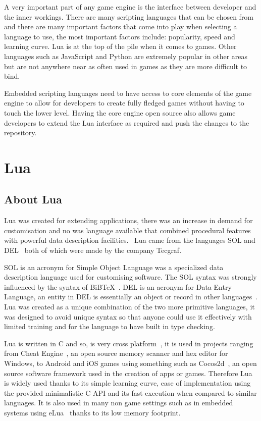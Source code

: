 \documentclass[11pt,a4paper,titlepage]{article}
\begin{document}
		A very important part of any game engine is the interface between developer and the inner workings. There are many scripting languages that can be chosen from and there are many important factors that come into play when selecting a language to use, the most important factors include: popularity, speed and learning curve. Lua is at the top of the pile when it comes to games. Other languages such as JavaScript and Python are extremely popular in other areas but are not anywhere near as often used in games as they are more difficult to bind.
					
		Embedded scripting languages need to have access to core elements of the game engine to allow for developers to create fully fledged games without having to touch the lower level. Having the core engine open source also allows game developers to extend the Lua interface as required and push the changes to the repository.
		
	\newpage

	\section{Lua}
		\subsection{About Lua}
			Lua was created for extending applications, there was an increase in demand for customisation and no was language available that combined procedural features with powerful data description facilities.~\cite{Ierusalimschy02software} Lua came from the languages SOL and DEL~\cite{Ierusalimschy01theevolution} both of which were made by the company Tecgraf.
			
			SOL is an acronym for Simple Object Language was a specialized data description language used for customising software. The SOL syntax was strongly influenced by the syntax of BiBTeX~\cite{Lamport:1989:LDP:63364}. DEL is an acronym for Data Entry Language, an entity in DEL is essentially an object or record in other languages~\cite{Ierusalimschy01theevolution}. Lua was created as a unique combination of the two more primitive languages, it was designed to avoid unique syntax so that anyone could use it effectively with limited training and for the language to have built in type checking.
			
			Lua is written in C and so, is very cross platform~\cite{LuaSource}, it is used in projects ranging from Cheat Engine~\cite{CheatEngine}, an open source memory scanner and hex editor for Windows, to Android and iOS games using something such as Cocos2d~\cite{COCOS2D}, an open source software framework used in the creation of apps or games. Therefore Lua is widely used thanks to its simple learning curve, ease of implementation using the provided minimalistic C API and its fast execution when compared to similar languages. It is also used in many non game settings such as in embedded systems using eLua~\cite{eLua} thanks to its low memory footprint.
\end{document}
